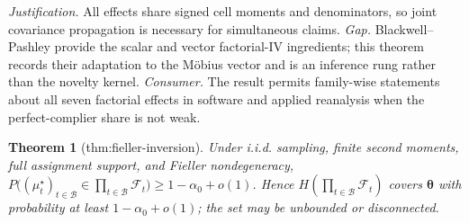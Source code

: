 \documentclass{article}
\newtheorem{theorem}{Theorem}
\begin{document}
\par\smallskip\noindent \textit{Justification.} All effects share signed cell moments and denominators, so joint covariance propagation is necessary for simultaneous claims. \textit{Gap.} Blackwell--Pashley provide the scalar and vector factorial-IV ingredients; this theorem records their adaptation to the Möbius vector and is an inference rung rather than the novelty kernel. \textit{Consumer.} The result permits family-wise statements about all seven factorial effects in software and applied reanalysis when the perfect-complier share is not weak.

\begin{theorem}[thm:fieller-inversion]\label{thm:fieller-inversion}
Under i.i.d. sampling, finite second moments, full assignment support, and Fieller nondegeneracy, \(P\bigl((\mu_t^\star)_{t\in\mathcal B}\in\prod_{t\in\mathcal B}\mathcal F_t\bigr)\ge1-\alpha_0+o(1)\). Hence \(H(\prod_{t\in\mathcal B}\mathcal F_t)\) covers \(\boldsymbol\theta\) with probability at least \(1-\alpha_0+o(1)\); the set may be unbounded or disconnected.
\end{theorem}
\end{document}
